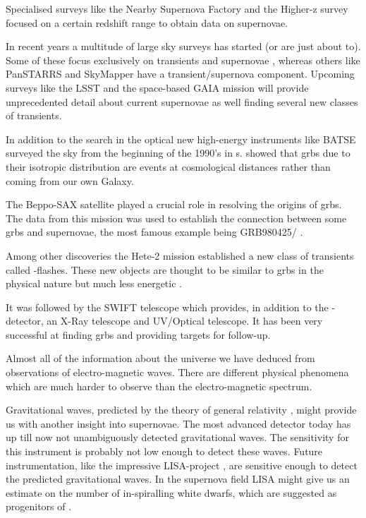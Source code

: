 Specialised surveys like the Nearby Supernova Factory \citep{2002SPIE.4836...61A} and the Higher-z survey \citep{2004ApJ...613..200S} focused on a certain redshift range to obtain data on supernovae.

In recent years a multitude of large sky surveys has started (or are just about to). Some of these focus exclusively on transients and supernovae \citep[e.g. PTF;][]{2009PASP..121.1334R}, whereas others like PanSTARRS \citep{2004SPIE.5489...11K} and SkyMapper \citep{2007PASA...24....1K} have a transient/supernova component. 
Upcoming surveys like the LSST \cite{2006AAS...209.8604P} and the space-based GAIA mission \cite{2001A&A...369..339P} will provide unprecedented detail about current supernovae as well finding several new classes of transients.

In addition to the search in the optical new high-energy instruments like BATSE surveyed the sky from the beginning of the 1990's in \gammaray s. \citet{1992Natur.355..143M} showed that \glspl{grb} due to their isotropic distribution are events at cosmological distances rather than coming from our own Galaxy. 

The Beppo-SAX satellite played a crucial role in resolving the origins of \glspl{grb}. The data from this mission was used to establish the connection between some  \glspl{grb} and supernovae, the most famous example being GRB980425/ \citep{1998Natur.395..670G}.

Among other discoveries the Hete-2 mission established a new class of transients called \xray-flashes. These new objects are thought to be similar to  \glspl{grb} in the physical nature but much less energetic \citep{2004ApJ...601L.119Z}.  

It was followed by the SWIFT telescope which provides, in addition to the \gammaray-detector, an X-Ray telescope and UV/Optical telescope. It has been very successful at finding \glspl{grb} and providing targets for follow-up.

Almost all of the information about the universe we have deduced from observations of electro-magnetic waves. There are different physical phenomena which are much harder to observe than the electro-magnetic spectrum.

Gravitational waves, predicted by the theory of general relativity  \cite{1918SPAW.......154E}, might provide us with another insight into supernovae. The most advanced detector today \cite[LIGO][]{1992Sci...256..325A} has up till now not unambiguously detected gravitational waves. The sensitivity for this instrument is probably not low enough to detect these waves. Future instrumentation, like the impressive LISA-project \citep{1994ESAJ...18..219J}, are sensitive enough to detect the predicted gravitational waves. In the supernova field LISA might give us an estimate on the number of in-spiralling white dwarfs, which are suggested as progenitors of \sneia.


